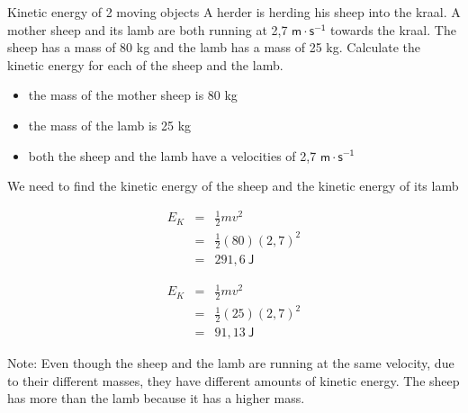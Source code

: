 \begin{wex}{Kinetic energy of 2 moving objects}
{A herder is herding his sheep into the kraal. A mother sheep and its lamb are both running at 2,7 $\mathsf{m \cdot s^{-1}}$ towards the kraal. The sheep has a mass of 80 kg and the lamb has a mass of 25 kg. Calculate the kinetic energy for each of the sheep and the lamb. 
}
{
\begin{itemize}
\item the mass of the mother sheep is 80 kg
\item the mass of the lamb is 25 kg
\item both the sheep and the lamb have a velocities of 2,7 $\mathsf{m \cdot s^{-1}}$
\end{itemize}

We need to find the kinetic energy of the sheep and the kinetic energy of its lamb

\begin{eqnarray*}
E_{K} &=& \frac{1}{2}mv^2 \\
&=& \frac{1}{2}(80)(2,7)^2 \\
&=& 291,6 \ \mathsf{J}
\end{eqnarray*}

\begin{eqnarray*}
E_{K} &=& \frac{1}{2}mv^2 \\
& = & \frac{1}{2}(25)(2,7)^2 \\
&=& 91,13 \ \mathsf{J}
\end{eqnarray*}

\noindent Note: Even though the sheep and the lamb are running at the same velocity, due to their different masses, they have different amounts of kinetic energy. The sheep has more than the lamb because it has a higher mass. 

}
\end{wex}


    \noindent
      \label{m38785*uid65}
